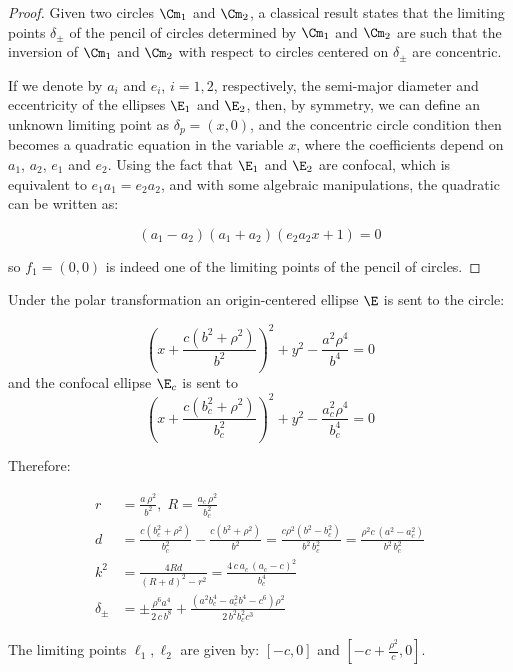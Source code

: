 \begin{proof}
Given two circles $\Cm_{1}$ and $\Cm_{2}$, a classical result states that the limiting points $\delta_{\pm}$ of the pencil of circles determined by $\Cm_{1}$ and $\Cm_{2}$ are such that the inversion of $\Cm_{1}$ and $\Cm_{2}$ with respect to circles centered on $\delta_{\pm}$ are concentric.

If we denote by $a_{i}$ and $e_{i}$, $i=1,2$, respectively, the semi-major diameter and eccentricity of the ellipses $\E_{1}$ and $\E_{2}$, then, by symmetry, we can define an unknown limiting point as $\delta_{p}=(x,0)$, and the concentric circle condition then becomes a quadratic equation in the variable $x$, where the coefficients depend on $a_{1}$, $a_{2}$, $e_{1}$ and $e_{2}$. Using the fact that $\E_{1}$ and $\E_{2}$ are confocal, which is equivalent to $e_{1}a_{1}=e_{2}a_{2}$, and with some algebraic manipulations, the quadratic can be written as:

\[ (a_{1}-a_{2})(a_{1}+a_{2})(e_{2}a_{2}x+1)=0 \]

\noindent so $f_{1}=(0,0)$ is indeed one of the limiting points of the pencil of circles.
\end{proof}  


Under the polar transformation an origin-centered ellipse $\E$ is sent to the circle:

\[ \left( x+{\frac {c \left( {b}^{2}+\rho^{2} \right) }{{b}^{2}}}
 \right) ^{2}+{y}^{2}-{\frac {{a}^{2}\rho^{4}}{{b}^4}}=0\]
 and the confocal ellipse $\E_c$ is sent to
 \[ \left( x+\frac {c \left( b_c^{2}+\rho^{2} \right) }{b_c^2}
 \right) ^{2}+{y}^{2}-{\frac {a_c^{2}\rho^{4}}{b_c^4}}=0\]
 
Therefore:

\begin{align*} r&=\frac{a \,\rho^2}{b^2},\; R=\frac{a_c\, \rho^2}{b_c^2}\\
d&=\frac {c \left( b_c^{2}+\rho^{2} \right) }{b_c^2}-\frac {c \left( b^{2}+\rho^{2} \right) }{b^2}=\frac{c \rho^2(b^2 - b_c^2)}{b^2\, b_c^2}=\frac{\rho^2 c\, (a^2 - a_c^2)}{b^2\, b_c^2}\\
  k^2&=\frac{4Rd}{(R+d)^2-r^2}=\frac{4 \,c\, a_c\,(a_c - c)^2    }{b_c^4}\\
  \delta_{\pm}&=\pm {\frac {\rho^{6}{a}^{4}}{2\,c\, {b}^{8}}}+{\frac { \left( {a}^{2} b_c^{4}-a_c^{2}{b}^{4}-{c}^{6} \right) \rho^{2}}{2\,{b}^{2}  b_c^{2} {c}^{3}}}
\end{align*}

 The limiting points $\ell_1,\ell_2$ are given by: $[-c,0]$ and $[-c+\frac{\rho^2}{c},0]$.
 
